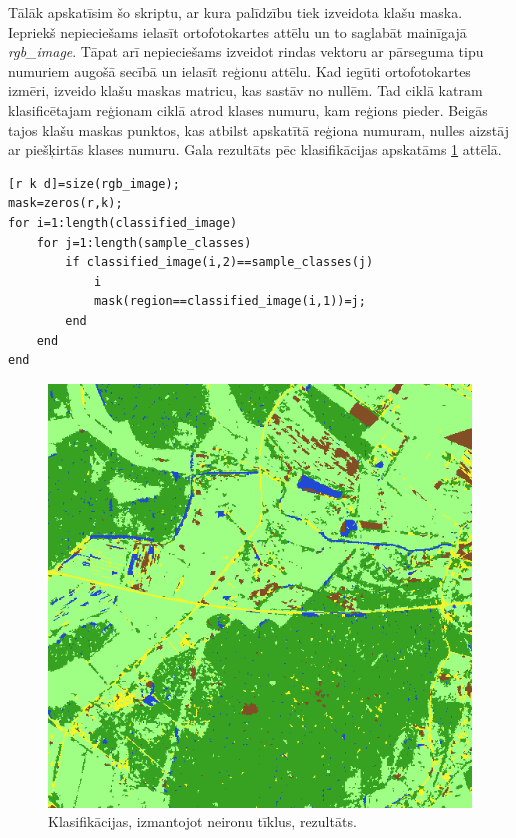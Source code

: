 \documentclass[12pt,paper=a4]{report}
\begin{document}
Tālāk apskatīsim šo skriptu, ar kura palīdzību tiek izveidota klašu maska. Iepriekš nepieciešams ielasīt ortofotokartes attēlu un to saglabāt mainīgajā \textit{rgb_image}. Tāpat arī nepieciešams izveidot rindas vektoru ar pārseguma tipu numuriem augošā secībā un ielasīt reģionu attēlu. Kad iegūti ortofotokartes izmēri, izveido klašu maskas matricu, kas sastāv no nullēm. Tad ciklā katram klasificētajam reģionam ciklā atrod klases numuru, kam reģions pieder. Beigās tajos klašu maskas punktos, kas atbilst apskatītā reģiona numuram, nulles aizstāj ar piešķirtās klases numuru. Gala rezultāts pēc klasifikācijas apskatāms \ref{fig:resultNN} attēlā.
\begin{lstlisting}
[r k d]=size(rgb_image);
mask=zeros(r,k);
for i=1:length(classified_image)
    for j=1:length(sample_classes)
        if classified_image(i,2)==sample_classes(j)
            i
            mask(region==classified_image(i,1))=j;
        end
    end
end
\end{lstlisting}
\begin{figure}[h!]
\centering
\includegraphics[width=.6\linewidth]{resultNN}
\caption{Klasifikācijas, izmantojot neironu tīklus, rezultāts.}
\label{fig:resultNN}
\end{figure}
\end{document}
